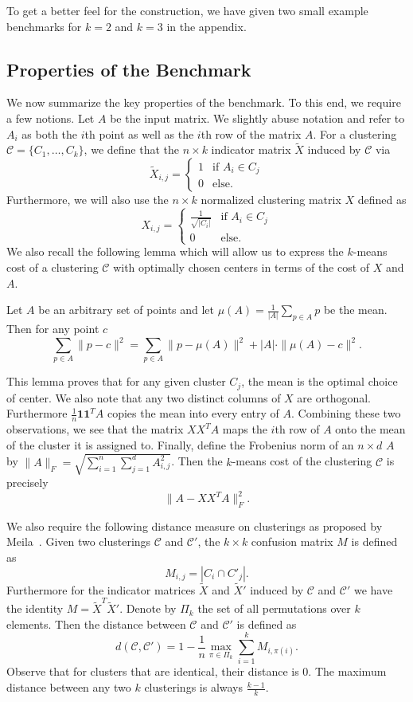 To get a better feel for the construction, we have given two small example benchmarks for $k=2$ and $k=3$ in the appendix.

\subsection{Properties of the Benchmark}

We now summarize the key properties of the benchmark.
To this end, we require a few notions.
Let $A$ be the input matrix. We slightly abuse notation and refer to $A_i$ as both the $i$th point as well as the $i$th row of the matrix $A$.
For a clustering $\mathcal{C}=\{C_1,\ldots ,C_k\}$, we define that the $n\times k$ indicator matrix $\tilde X$ induced by $\mathcal{C}$ via
$$ \tilde X_{i,j} = \begin{cases}1 & \text{if } A_i\in C_j \\
0 & \text{else.} \end{cases}$$
Furthermore, we will also use the $n\times k$ normalized clustering matrix $ X$ defined as
$$ X_{i,j} = \begin{cases}\frac{1}{\sqrt{|C_i|}} & \text{if } A_i\in C_j \\
0 & \text{else.} \end{cases}$$
We also recall the following lemma which will allow us to express the $k$-means cost of a clustering $\mathcal{C}$ with optimally chosen centers in terms of the cost of $X$ and $A$.
\begin{lemma}[Folklore]
\label{lem:magic}
Let $A$ be an arbitrary set of points and let $\mu(A) = \frac{1}{|A|}\sum_{p\in A} p$ be the mean. Then for any point $c$
$$ \sum_{p\in A} \|p-c\|^2 = \sum_{p\in A} \|p-\mu(A)\|^2 + |A|\cdot \|\mu(A)-c\|^2.$$
\end{lemma}
This lemma proves that for any given cluster $C_j$, the mean is the optimal choice of center. 
We also note that any two distinct columns of $X$ are orthogonal. Furthermore $\frac{1}{n}\mathbf{1}\mathbf{1}^TA$ copies the mean into every entry of $A$. Combining these two observations, we see that the matrix $XX^TA$ maps the $i$th row of $A$ onto the mean of the cluster it is assigned to. Finally, define the Frobenius norm of an $n\times d$ $A$ by $\|A\|_F = \sqrt{\sum_{i=1}^n\sum_{j=1}^d A_{i,j}^2}$. Then the $k$-means cost of the clustering $\mathcal{C}$ is precisely
$$\|A-XX^TA\|_F^2.$$

We also require the following distance measure on clusterings as proposed by Meila~\cite{Meila05,Meila06}. Given two clusterings $\mathcal{C}$ and $\mathcal{C'}$, the $k\times k$ confusion matrix $M$ is defined as
$$ M_{i,j} = |C_i\cap C'_j|.$$
Furthermore for the indicator matrices $\tilde X$ and $\tilde X'$ induced by $\mathcal{C}$ and $\mathcal{C'}$ we have the identity $M=\tilde X^T {\tilde X'}$.
Denote by $\Pi_k$ the set of all permutations over $k$ elements. Then the distance between  $\mathcal{C}$ and $\mathcal{C'}$ is defined as
$$d(\mathcal{C},\mathcal{C'}) = 1-\frac{1}{n}\underset{\pi\in \Pi_k}{\max} \sum_{i=1}^k M_{i,\pi(i)}.$$
Observe that for clusters that are identical, their distance is $0$. The maximum distance between any two $k$ clusterings is always $\frac{k-1}{k}$.


